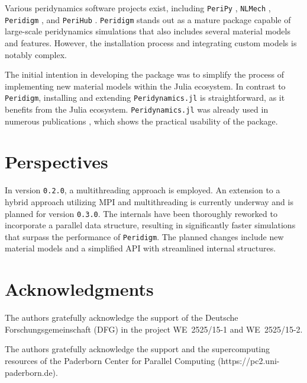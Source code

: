 \documentclass{juliacon}
\begin{document}
Various peridynamics software projects exist, including \texttt{PeriPy} \cite{PeriPy2021}, \texttt{NLMech} \cite{Jha2021}, \texttt{Peridigm} \cite{Peridigm2024}, and \texttt{PeriHub} \cite{Willberg2023}.
\texttt{Peridigm} stands out as a mature package capable of large-scale peridynamics simulations that also 
includes several material models and features.
However, the installation process and integrating custom models is notably complex.

The initial intention in developing the package was to simplify the process of implementing new material models within the Julia ecosystem.
In contrast to \texttt{Peridigm}, installing and extending \texttt{Peridynamics.jl} is straightforward, as it benefits from the Julia ecosystem.
\texttt{Peridynamics.jl} was already used in numerous publications \cite{Friebertshaeuser2022PAMM,Friebertshaeuser2022AIMS,Partmann2023IJF,Partmann2024AAM,Partmann2024PAMM,Tornquist2022PAMM}, which shows the practical usability of the package.

\section{Perspectives}
In version \texttt{0.2.0}, a multithreading approach is employed.
An extension to a hybrid approach utilizing MPI and multithreading is currently underway and is planned for version \texttt{0.3.0}.
The internals have been thoroughly reworked to incorporate a parallel data structure, resulting in significantly faster simulations that surpass the performance of \texttt{Peridigm}.
The planned changes include new material models and a simplified API with streamlined internal structures.

\section{Acknowledgments}
The authors gratefully acknowledge the support of the Deutsche Forschungsgemeinschaft (DFG) in the project \mbox{WE~2525/15-1} and \mbox{WE~2525/15-2}.

The authors gratefully acknowledge the support and the supercomputing resources of the Paderborn Center for Parallel Computing (https://pc2.uni-paderborn.de).



\end{document}
